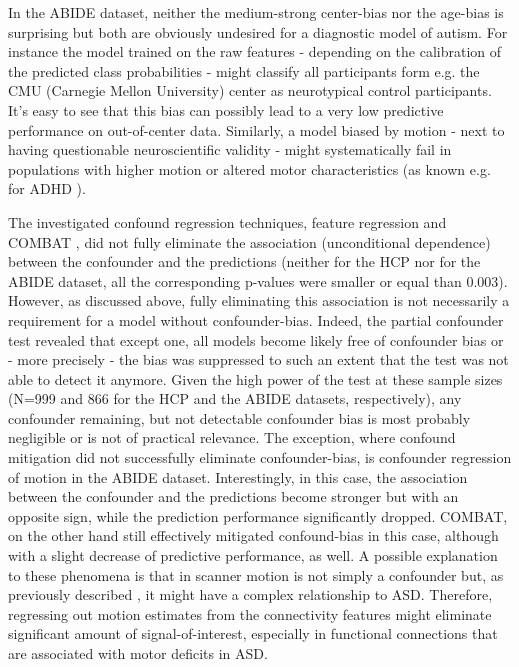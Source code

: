 \documentclass{article}
\begin{document}
In the ABIDE dataset, neither the medium-strong center-bias nor the age-bias is surprising but both are obviously undesired for a diagnostic model of autism. For instance the model trained on the raw features - depending on the calibration of the predicted class probabilities - might classify all participants form e.g. the CMU (Carnegie Mellon University) center as neurotypical control participants. It's easy to see that this bias can possibly lead to a very low predictive performance on out-of-center data. Similarly, a model biased by motion - next to having questionable neuroscientific validity - might systematically fail in populations with higher motion or altered motor characteristics (as known e.g. for ADHD \cite{eloyan2012automated}).

The investigated confound regression techniques, feature regression  \citep{spisak2014voxel, dukart2011age, abdulkadir2014reduction, rao2017predictive} and COMBAT \citep{johnson2007adjusting}, did not fully eliminate the association (unconditional dependence) between the confounder and the predictions (neither for the HCP nor for the ABIDE dataset, all the corresponding p-values were smaller or equal than 0.003). However, as discussed above, fully eliminating this association is not necessarily a requirement for a model without confounder-bias. Indeed, the partial confounder test revealed that except one, all models become likely free of confounder bias or - more precisely - the bias was suppressed to such an extent that the test was not able to detect it anymore. Given the high power of the test at these sample sizes (N=999 and 866 for the HCP and the ABIDE datasets, respectively), any confounder remaining, but not detectable confounder bias is most probably negligible or is not of practical relevance.
The exception, where confound mitigation did not successfully eliminate confounder-bias, is confounder regression of motion in the ABIDE dataset. Interestingly, in this case, the association between the confounder and the predictions become stronger but with an opposite sign, while the prediction performance significantly dropped. COMBAT, on the other hand still effectively mitigated confound-bias in this case, although with a slight decrease of predictive performance, as well. A possible explanation to these phenomena is that in scanner motion is not simply a confounder but, as previously described \citep{fournier2010motor, anzulewicz2016toward}, it might have a complex relationship to ASD. Therefore, regressing out motion estimates from the connectivity features might eliminate significant amount of signal-of-interest, especially in functional connections that are associated with motor deficits in ASD. 
\end{document}
